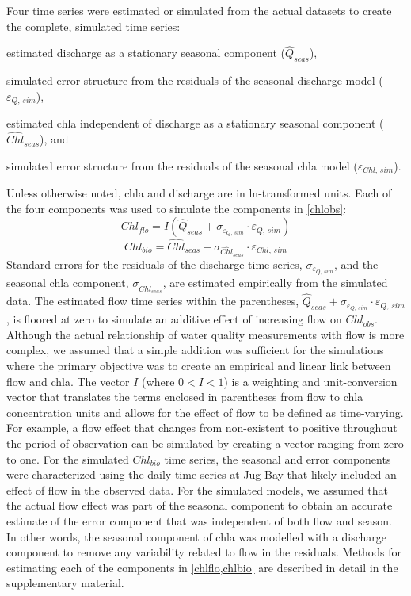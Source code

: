 \documentclass{svjour3}\usepackage[]{graphicx}\usepackage[]{color}
\begin{document}
Four time series were estimated or simulated from the actual datasets to create the complete, simulated time series:\begin{inparaenum}[1\upshape)]
\item estimated discharge as a stationary seasonal component ($\widehat{Q}_{seas}$),
\item simulated error structure from the residuals of the seasonal discharge model ($\varepsilon_{Q,\,sim}$), 
\item estimated \ac{chla} independent of discharge as a stationary seasonal component ($\widehat{Chl}_{seas}$), and
\item simulated error structure from the residuals of the seasonal \ac{chla} model ($\varepsilon_{Chl,\,sim}$).
\end{inparaenum}
Unless otherwise noted, \ac{chla} and discharge are in ln-transformed units.  Each of the four components was used to simulate the components in \cref{chlobs}:
\begin{equation} \label{chlflo}
Chl_{flo} = I\left(\widehat{Q}_{seas} + \sigma_{\varepsilon_{Q,\,sim}}\cdot\varepsilon_{Q,\,sim}\right)
\end{equation}
\begin{equation} \label{chlbio}
Chl_{bio} = \widehat{Chl}_{seas} + \sigma_{\widehat{Chl}_{seas}}\cdot\varepsilon_{Chl,\,sim}
\end{equation}
Standard errors for the residuals of the discharge time series, $\sigma_{\varepsilon_{Q,\,sim}}$, and the seasonal \ac{chla} component, $\sigma_{\widehat{Chl}_{seas}}$, are estimated empirically from the simulated data.  The estimated flow time series within the parentheses, $\widehat{Q}_{seas} + \sigma_{\varepsilon_{Q,\,sim}}\cdot\varepsilon_{Q,\,sim}$, is floored at zero to simulate an additive effect of increasing flow on $Chl_{obs}$.  Although the actual relationship of water quality measurements with flow is more complex, we assumed that a simple addition was sufficient for the simulations where the primary objective was to create an empirical and linear link between flow and \ac{chla}. The vector $I$  (where $0 < I < 1$) is a weighting and unit-conversion vector that translates the terms enclosed in parentheses from flow to \ac{chla} concentration units and allows for the effect of flow to be defined as time-varying. For example, a flow effect that changes from non-existent to positive throughout the period of observation can be simulated by creating a vector ranging from zero to one. For the simulated $Chl_{bio}$ time series, the seasonal and error components were characterized using the daily time series at Jug Bay that likely included an effect of flow in the observed data.  For the simulated models, we assumed that the actual flow effect was part of the seasonal component to obtain an accurate estimate of the error component that was independent of both flow and season.  In other words, the seasonal component of \ac{chla} was modelled with a discharge component to remove any variability related to flow in the residuals. Methods for estimating each of the components in \cref{chlflo,chlbio} are described in detail in the supplementary material.
\end{document}
